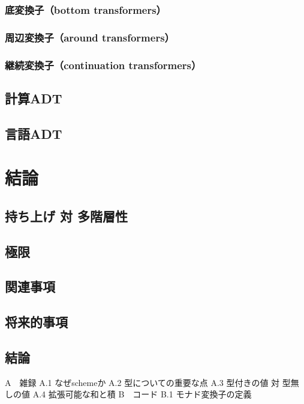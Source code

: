 \documentclass[11pt, oneside]{jsarticle}   	%
\begin{document}
\subsubsection{ 底変換子（bottom transformers） }
\subsubsection{ 周辺変換子（around transformers） }
\subsubsection{ 継続変換子（continuation transformers） }
\subsection{ 計算ADT }
\subsection{ 言語ADT }
\section{ 結論 }
\subsection{ 持ち上げ 対 多階層性 }
\subsection{ 極限 }
\subsection{ 関連事項 }
\subsection{ 将来的事項 }
\subsection{ 結論 }
A　雑録
    A.1    なぜschemeか
    A.2    型についての重要な点
    A.3    型付きの値 対 型無しの値
    A.4    拡張可能な和と積
B　コード
    B.1    モナド変換子の定義
\end{document}
